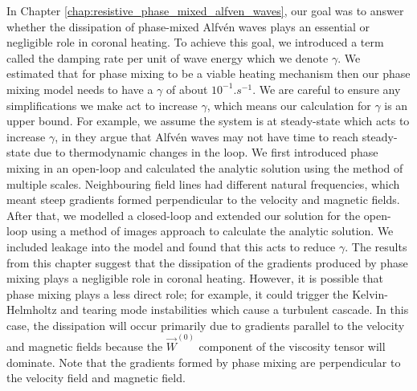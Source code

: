 In Chapter \ref{chap:resistive_phase_mixed_alfven_waves}, our goal was to answer whether the dissipation of phase-mixed Alfv\'en waves plays an essential or negligible role in coronal heating. To achieve this goal, we introduced a term called the damping rate per unit of wave energy which we denote $\gamma$. We estimated that for phase mixing to be a viable heating mechanism then our phase mixing model needs to have a $\gamma$ of about $10^{-1}\si{.s^{-1}}$. We are careful to ensure any simplifications we make act to increase $\gamma$, which means our calculation for $\gamma$ is an upper bound. For example, we assume the system is at steady-state which acts to increase $\gamma$, in \citet{Arregui2015} they argue that Alfv\'en waves may not have time to reach steady-state due to thermodynamic changes in the loop. We first introduced phase mixing in an open-loop and calculated the analytic solution using the method of multiple scales. Neighbouring field lines had different natural frequencies, which meant steep gradients formed perpendicular to the velocity and magnetic fields. After that, we modelled a closed-loop and extended our solution for the open-loop using a method of images approach to calculate the analytic solution. We included leakage into the model and found that this acts to reduce $\gamma$. The results from this chapter suggest that the dissipation of the gradients produced by phase mixing plays a negligible role in coronal heating. However, it is possible that phase mixing plays a less direct role; for example, it could trigger the Kelvin-Helmholtz and tearing mode instabilities which cause a turbulent cascade. In this case, the dissipation will occur primarily due to gradients parallel to the velocity and magnetic fields because the $\vec{W}^{(0)}$ component of the viscosity tensor will dominate. Note that the gradients formed by phase mixing are perpendicular to the velocity field and magnetic field.

